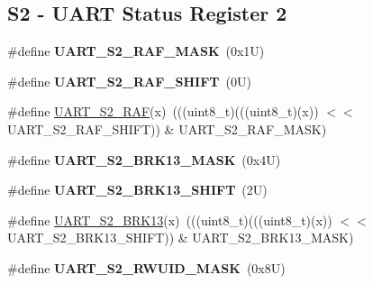 \subsection*{S2 -\/ U\+A\+RT Status Register 2}
\begin{DoxyCompactItemize}
\item 
\mbox{\label{group___u_a_r_t___register___masks_gaa16c5c48ff5ecf080e485880145828c0}} 
\#define {\bfseries U\+A\+R\+T\+\_\+\+S2\+\_\+\+R\+A\+F\+\_\+\+M\+A\+SK}~(0x1\+U)
\item 
\mbox{\label{group___u_a_r_t___register___masks_ga0eb8d9ed83a7cb0ed2edc0d3906ac5f1}} 
\#define {\bfseries U\+A\+R\+T\+\_\+\+S2\+\_\+\+R\+A\+F\+\_\+\+S\+H\+I\+FT}~(0\+U)
\item 
\#define \mbox{\hyperlink{group___u_a_r_t___register___masks_ga6fb68989d33d0cd0c7908bd5bf3e498b}{U\+A\+R\+T\+\_\+\+S2\+\_\+\+R\+AF}}(x)~(((uint8\+\_\+t)(((uint8\+\_\+t)(x)) $<$$<$ U\+A\+R\+T\+\_\+\+S2\+\_\+\+R\+A\+F\+\_\+\+S\+H\+I\+FT)) \& U\+A\+R\+T\+\_\+\+S2\+\_\+\+R\+A\+F\+\_\+\+M\+A\+SK)
\item 
\mbox{\label{group___u_a_r_t___register___masks_gab2b333a78ce968eece87bcecd87a8673}} 
\#define {\bfseries U\+A\+R\+T\+\_\+\+S2\+\_\+\+B\+R\+K13\+\_\+\+M\+A\+SK}~(0x4\+U)
\item 
\mbox{\label{group___u_a_r_t___register___masks_ga6b19eb1eefbef73859cc6eec77d863e4}} 
\#define {\bfseries U\+A\+R\+T\+\_\+\+S2\+\_\+\+B\+R\+K13\+\_\+\+S\+H\+I\+FT}~(2\+U)
\item 
\#define \mbox{\hyperlink{group___u_a_r_t___register___masks_ga239a880d2d8279a8d9b91ac1a828735e}{U\+A\+R\+T\+\_\+\+S2\+\_\+\+B\+R\+K13}}(x)~(((uint8\+\_\+t)(((uint8\+\_\+t)(x)) $<$$<$ U\+A\+R\+T\+\_\+\+S2\+\_\+\+B\+R\+K13\+\_\+\+S\+H\+I\+FT)) \& U\+A\+R\+T\+\_\+\+S2\+\_\+\+B\+R\+K13\+\_\+\+M\+A\+SK)
\item 
\mbox{\label{group___u_a_r_t___register___masks_gac04113c9c307f88a4e51db472d274eee}} 
\#define {\bfseries U\+A\+R\+T\+\_\+\+S2\+\_\+\+R\+W\+U\+I\+D\+\_\+\+M\+A\+SK}~(0x8\+U)
\item 
\mbox{\label{group___u_a_r_t___register___masks_ga9a972894e69ee588eab48c8436be9fde}} 

\end{DoxyCompactItemize}
